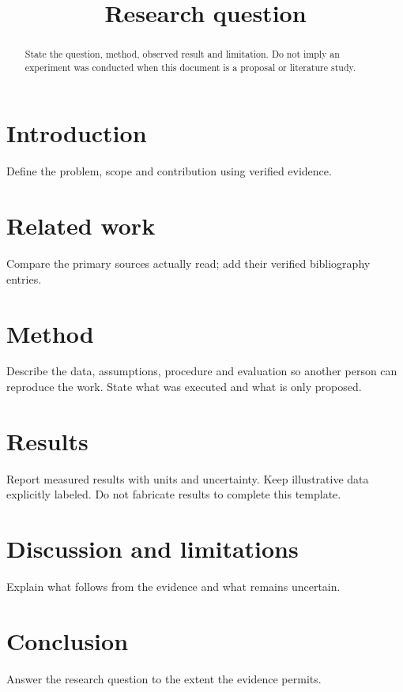 \documentclass[11pt,a4paper]{article}
\title{Research question}
\author{}
\date{}
\begin{document}
\maketitle
\begin{abstract}
State the question, method, observed result and limitation. Do not imply an
experiment was conducted when this document is a proposal or literature study.
\end{abstract}

\section{Introduction}
Define the problem, scope and contribution using verified evidence.

\section{Related work}
Compare the primary sources actually read; add their verified bibliography entries.

\section{Method}
Describe the data, assumptions, procedure and evaluation so another person can
reproduce the work. State what was executed and what is only proposed.

\section{Results}
Report measured results with units and uncertainty. Keep illustrative data
explicitly labeled. Do not fabricate results to complete this template.

\section{Discussion and limitations}
Explain what follows from the evidence and what remains uncertain.

\section{Conclusion}
Answer the research question to the extent the evidence permits.

% 
% 
\end{document}
